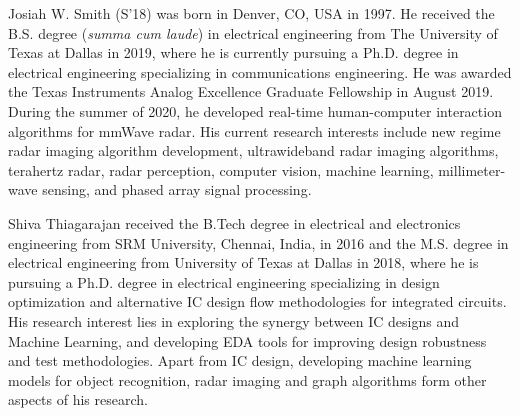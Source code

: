 \documentclass{ieeeaccess}
\begin{document}
\printbibliography

\begin{IEEEbiography}{Josiah W. Smith} (S'18) was born in Denver, CO, USA in 1997. He received the B.S. degree (\textit{summa cum laude}) in electrical engineering from The University of Texas at Dallas in 2019, where he is currently pursuing a Ph.D. degree in electrical engineering specializing in communications engineering. He was awarded the Texas Instruments Analog Excellence Graduate Fellowship in August 2019. During the summer of 2020, he developed real-time human-computer interaction algorithms for mmWave radar. His current research interests include new regime radar imaging algorithm development, ultrawideband radar imaging algorithms, terahertz radar, radar perception, computer vision, machine learning, millimeter-wave sensing, and phased array signal processing.
\end{IEEEbiography}

\begin{IEEEbiography}{Shiva Thiagarajan} received the B.Tech degree in electrical and electronics engineering from SRM University, Chennai, India, in 2016 and the M.S. degree in electrical engineering from University of Texas at Dallas in 2018, where he is pursuing a Ph.D. degree in electrical engineering specializing in design optimization and alternative IC design flow methodologies for integrated circuits. His research interest lies in exploring the synergy between IC designs and Machine Learning, and developing EDA tools for improving design robustness and test methodologies. Apart from IC design, developing machine learning models for object recognition, radar imaging and graph algorithms form other aspects of his research.
\end{IEEEbiography}
\end{document}
